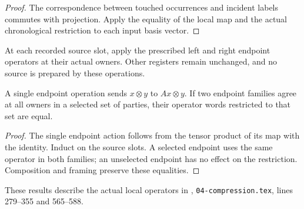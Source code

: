 \begin{proof}\leanok
    The correspondence between touched occurrences and incident labels
    commutes with projection. Apply the equality of the local map and
    the actual chronological restriction to each input basis vector.
\end{proof}

\begin{definition}
    \label{def:peps_actual_endpoint_word}
    \leanok
    At each recorded source slot, apply the prescribed left and right
    endpoint operators at their actual owners. Other registers remain
    unchanged, and no source is prepared by these operations.
\end{definition}

\begin{theorem}
    \label{thm:peps_actual_endpoint_locality}
    \leanok
    A single endpoint operation sends $x\otimes y$ to $Ax\otimes y$.
    If two endpoint families agree at all owners in a selected set of
    parties, their operator words restricted to that set are equal.
\end{theorem}

\begin{proof}\leanok
    The single endpoint action follows from the tensor product of its map
    with the identity. Induct on the source slots. A selected endpoint
    uses the same operator in both families; an unselected endpoint has
    no effect on the restriction. Composition and framing preserve these
    equalities.
\end{proof}

These results describe the actual local operators in
\cite[proof of Theorem~5.2]{OpenAI2026PolynomialPEPS},
\texttt{04-compression.tex}, lines 279--355 and 565--588.
